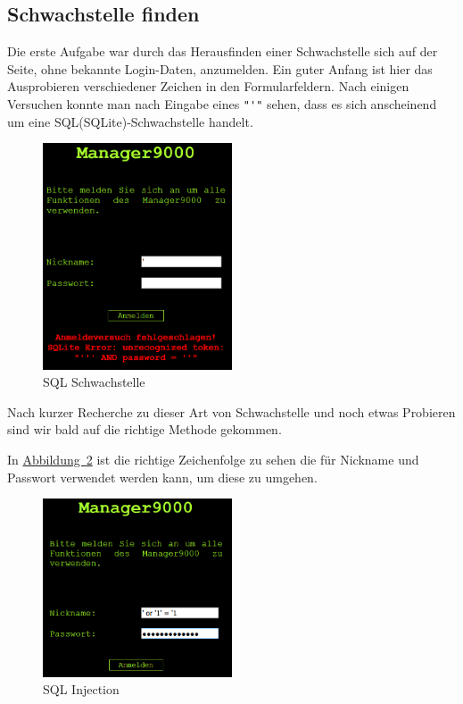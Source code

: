 \documentclass[12pt,a4paper,titlepage,oneside]{scrartcl}
\begin{document}
\subsection{Schwachstelle finden}

Die erste Aufgabe war durch das Herausfinden einer Schwachstelle sich auf der Seite, ohne bekannte Login-Daten, anzumelden.
Ein guter Anfang ist hier das Ausprobieren verschiedener Zeichen in den Formularfeldern. Nach einigen Versuchen konnte man nach Eingabe eines \lstinline{"'"} sehen, dass es sich anscheinend um eine SQL(SQLite)-Schwachstelle handelt.

\begin{figure}[h!]
  \centering
    \includegraphics[width=0.5\textwidth]{./imgs/manager9000/m9000_sql_error1.png}
  \caption{SQL Schwachstelle}
  \label{fig:sql_weakness}
\end{figure}

Nach kurzer Recherche zu dieser Art von Schwachstelle und noch etwas Probieren sind wir bald auf die richtige Methode gekommen.

In \hyperref[fig:sql_injection]{Abbildung~\ref*{fig:sql_injection}} ist die richtige Zeichenfolge zu sehen die für Nickname und Passwort verwendet werden kann, um diese zu umgehen.

\begin{figure}[h!]
  \centering
  \includegraphics[width=0.5\textwidth]{./imgs/manager9000/m9000_sql_injection.png}
\caption{SQL Injection}
\label{fig:sql_injection}
\end{figure}
\end{document}
